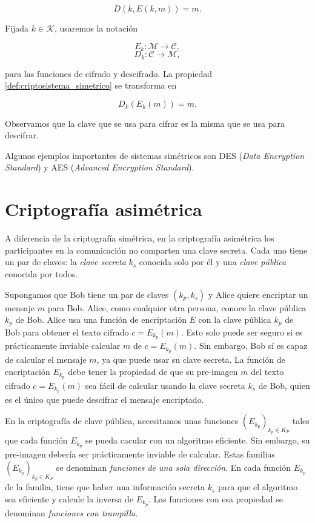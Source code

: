 \begin{equation}
    \label{def:criptosistema_simetrico}
    D(k, E(k, m)) = m.
\end{equation}

Fijada $k \in \mathcal{K}$, usaremos la notación 

$$E_k : \mathcal{M} \rightarrow \mathcal{C},$$
$$D_k : \mathcal{C} \rightarrow \mathcal{M},$$

para las funciones de cifrado y descifrado. La propiedad \ref{def:criptosistema_simetrico} se transforma en

$$D_k \left( E_k (m) \right) = m.$$

Observamos que la clave que se usa para cifrar es la misma que se usa para descifrar.

Algunos ejemplos importantes de sistemas simétricos son DES (\emph{Data Encryption Standard}) y AES (\emph{Advanced Encryption Standard}).

\section{Criptografía asimétrica}

A diferencia de la criptografía simétrica, en la criptografía asimétrica los participantes en la comunicación no comparten una clave secreta. Cada uno tiene un par de claves: la \emph{clave secreta} $k_s$ conocida solo por él y una \emph{clave pública} conocida por todos.

Supongamos que Bob tiene un par de claves $(k_p, k_s)$ y Alice quiere encriptar un mensaje $m$ para Bob. Alice, como cualquier otra persona, conoce la clave pública $k_p$ de Bob. Alice usa una función de encriptación $E$ con la clave pública $k_p$ de Bob para obtener el texto cifrado $c = E_{k_p}(m)$. Esto solo puede ser seguro si es prácticamente inviable calcular $m$ de $c = E_{k_p}(m)$. Sin embargo, Bob sí es capaz de calcular el mensaje $m$, ya que puede usar su clave secreta. La función de encriptación $E_{k_p}$ debe tener la propiedad de que su pre-imagen $m$ del texto cifrado $c = E_{k_p}(m)$ sea fácil de calcular usando la clave secreta $k_s$ de Bob, quien es el único que puede descifrar el mensaje encriptado.

En la criptografía de clave pública, necesitamos unas funciones $\left( E_{k_p} \right)_{k_p \in K_P}$ tales que cada función $E_{k_p}$ se pueda cacular con un algoritmo eficiente. Sin embargo, su pre-imagen debería ser prácticamente inviable de calcular. Estas familias $\left( E_{k_p} \right)_{k_p \in K_P}$ se denominan \emph{funciones de una sola dirección}. En cada función $E_{k_p}$ de la familia, tiene que haber una información secreta $k_s$ para que el algoritmo sea eficiente y calcule la inversa de $E_{k_p}$. Las funciones con esa propiedad se denominan \emph{funciones con trampilla}.

